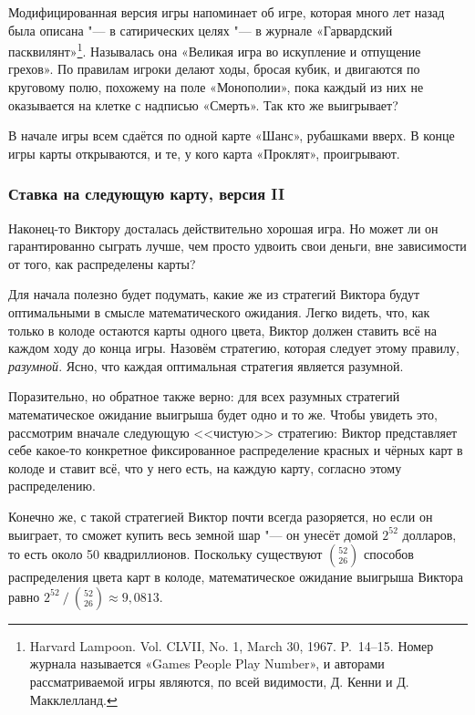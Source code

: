 \documentclass[twoside]{book}
\begin{document}
Модифицированная версия игры %
напоминает об игре, которая много лет назад была описана "--- в сатирических целях "--- в журнале «Гарвардский пасквилянт»\footnote{Harvard Lampoon. Vol. CLVII, No. 1, March 30, 1967. P.~14--15.
Номер журнала называется «Games People Play Number», и авторами рассматриваемой игры являются, по всей видимости, Д. Кенни и Д. Макклелланд.%
}.
Называлась она «Великая игра во искупление и отпущение грехов».
По правилам игроки делают ходы, бросая кубик, и двигаются по круговому полю, похожему на поле «Монополии», пока каждый из них не оказывается на клетке с надписью «Смерть».
Так кто же выигрывает?

В начале игры всем сдаётся по одной карте «Шанс», рубашками вверх.
В конце игры карты открываются, и те, у кого карта «Проклят», проигрывают.

\subsubsection*{Ставка на следующую карту, версия II}%

Наконец-то Виктору досталась действительно хорошая игра.
Но может ли он гарантированно сыграть лучше, чем просто удвоить свои деньги, вне зависимости от того, как распределены карты?

\medskip

Для начала полезно будет подумать, какие же из стратегий Виктора будут
оптимальными в смысле математического ожидания.
Легко видеть, что, как только в колоде остаются карты одного цвета, Виктор должен ставить всё на каждом ходу до конца игры.
Назовём стратегию, которая следует этому правилу, \emph{разумной}.
Ясно, что каждая оптимальная стратегия является разумной.

Поразительно, но обратное также верно: для всех разумных стратегий
математическое ожидание выигрыша будет одно и то же.
Чтобы увидеть
это, рассмотрим вначале следующую <<чистую>> стратегию: Виктор
представляет себе какое-то конкретное фиксированное распределение
красных и чёрных карт в колоде и ставит всё, что у него есть, на
каждую карту, согласно этому распределению.

Конечно же, с такой стратегией Виктор почти всегда разоряется, но если он выиграет, то сможет купить весь земной шар "--- он унесёт домой $2^{52}$ долларов, то есть около 50 квадриллионов.
Поскольку существуют $\binom{52}{26}$\vspace{0pt minus6pt} способов
распределения цвета карт в колоде, математическое ожидание выигрыша Виктора равно $2^{52}\mathbin/\binom{52}{26} \approx 9{,}0813$.
\end{document}
